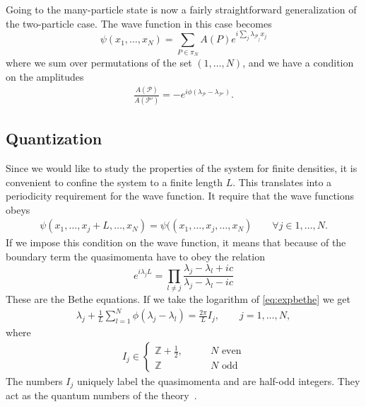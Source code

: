 \documentclass[11pt, a4paper]{report} %
\begin{document}
Going to the many-particle state is now a fairly straightforward generalization of the two-particle case.
The wave function in this case becomes~\cite{Gaudin2009}
\begin{equation}
	\psi(x_1,\ldots,x_N) = \sum_{P\in\pi_N} A(P) e^{i\sum_j \lambda_{\mathcal{P}_j} x_j}
\end{equation}
where we sum over permutations of the set \((1,\ldots,N)\), and we have a condition on the amplitudes~\cite{Franchini2017}
\begin{align}
  \label{eq:41}
  \frac{A(\mathcal{P})}{A(\mathcal{P'})} = -e^{i\phi(\lambda_{\mathcal{P}} - \lambda_{\mathcal{P'}})}.
\end{align}


\subsection{Quantization}

Since we would like to study the properties of the system for finite densities, it is convenient to confine the system to a finite length \(L\).
This translates into a periodicity requirement for the wave function.
It require that the wave functions obeys~\cite{Franchini2017}
\begin{align}
	\psi(x_1,\ldots,x_j+L,\ldots,x_N) = \psi((x_1,\ldots,x_j,\ldots,x_N) \qquad \forall j\in 1,\ldots,N.
\end{align}
If we impose this condition on the wave function, it means that because of the boundary term the quasimomenta have to obey the relation~\cite{Korepin1993}
\begin{equation}
  \label{eq:expbethe}
  e^{i\lambda_jL} = \prod_{l\neq j} \frac{\lambda_j-\lambda_l + ic}{\lambda_j - \lambda_l - ic}
\end{equation}
These are the Bethe equations.
If we take the logarithm of \cref{eq:expbethe} we get
\begin{align}
  \label{eq:bethe_equations}
  \lambda_j + \frac{1}{L} \sum_{l=1}^N \phi(\lambda_j - \lambda_l) = \frac{2\pi}{L}I_j, \qquad j = 1,\ldots,N,
\end{align}
where
\begin{align}
I_j \in 
\begin{cases}
  \mathbb{Z} + \frac{1}{2}, \qquad &N \textrm{ even}\\
  \mathbb{Z}  &N \textrm{ odd}
\end{cases}
\end{align}
The numbers \(I_j\) uniquely label the quasimomenta and are half-odd integers. 
They act as the quantum numbers of the theory~\cite{Franchini2017}.
\end{document}
